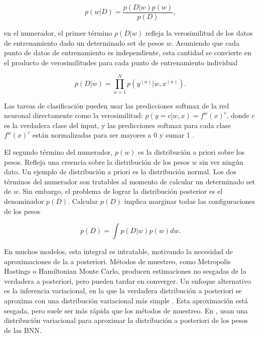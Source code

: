 \documentclass[10pt, oneside, a4paper]{article}
\begin{document}
	\begin{equation} \label{eq:2}
	p(w|D) = \frac{p(D|w) p(w)}{p(D)},
	\end{equation}
	
	en el numerador, el primer término $p(D|w)$ refleja la verosimilitud de los datos de entrenamiento dado un determinado set de pesos $w$. Asumiendo que cada punto de datos de entrenamiento es independiente, esta cantidad se convierte en el producto de verosimilitudes para cada punto de entrenamiento individual

	\begin{equation} \label{eq:3}
	p(D|w) = \prod_{n=1}^{N} p(y^{(n)} | w,x^{(n)}).
	\end{equation}
	
	Las tareas de clasificación pueden usar las predicciones softmax de la red neuronal directamente como la verosimilitud: $p(y = c |w,x) = f^{w}(x)^{c}$, donde $c$ es la verdadera clase del input, y las predicciones softmax para cada clase $f^{w}(x)^{c}$  están normalizadas para ser mayores a 0 y sumar 1 \cite{chai2018uncertainty}.
	
	El segundo término del numerador, $p(w)$ es la distribución a priori sobre los pesos. Refleja una creencia sobre la distribución de los pesos $w$ sin ver ningún dato. Un ejemplo de distribución a priori es la distribución normal. Los dos términos del numerador son tratables al momento de calcular un determinado set de $w$. Sin embargo, el problema de lograr la distribución posterior es el denominador $p(D)$. Calcular $p(D)$ implica marginar todas las configuraciones de los pesos

	\begin{equation} \label{eq:4}
	p(D) = \int p(D|w) p(w) dw.
	\end{equation}
	
	En muchos modelos, esta integral es intratable, motivando la necesidad de aproximaciones de la a posteriori. Métodos de muestreo, como Metropolis Hastings o Hamiltonian Monte Carlo,
	producen estimaciones no sesgadas de la verdadera a posteriori, pero pueden tardar en converger. Un enfoque alternativo es la inferencia variacional, en la que la verdadera distribución a posteriori se aproxima con una distribución variacional más simple \cite{blei2017variational, jordan1999introduction}. Esta aproximación está sesgada, pero suele ser más rápida que los métodos de muestreo. En \cite{chai2018uncertainty}, usan una distribución variacional para aproximar la distribución a posteriori de los pesos de las BNN.
	
\end{document}
